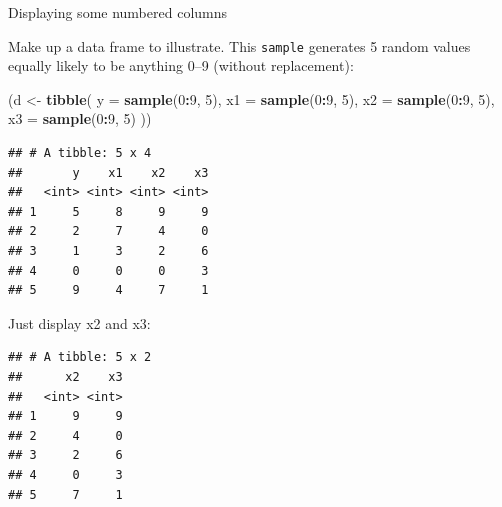 \documentclass[ignorenonframetext,]{beamer}
\newenvironment{Shaded}{\begin{snugshade}}{\end{snugshade}}
\newcommand{\DataTypeTok}[1]{\textcolor[rgb]{0.13,0.29,0.53}{#1}}
\newcommand{\DecValTok}[1]{\textcolor[rgb]{0.00,0.00,0.81}{#1}}
\newcommand{\KeywordTok}[1]{\textcolor[rgb]{0.13,0.29,0.53}{\textbf{#1}}}
\newcommand{\NormalTok}[1]{#1}
\newcommand{\OperatorTok}[1]{\textcolor[rgb]{0.81,0.36,0.00}{\textbf{#1}}}
\newcommand{\StringTok}[1]{\textcolor[rgb]{0.31,0.60,0.02}{#1}}
\begin{document}
\begin{frame}[fragile]{Displaying some numbered columns}
\protect\hypertarget{displaying-some-numbered-columns}{}

Make up a data frame to illustrate. This \texttt{sample} generates 5
random values equally likely to be anything 0--9 (without replacement):

\begin{Shaded}
\begin{Highlighting}[]
\NormalTok{(d <-}\StringTok{ }\KeywordTok{tibble}\NormalTok{(}
  \DataTypeTok{y =} \KeywordTok{sample}\NormalTok{(}\DecValTok{0}\OperatorTok{:}\DecValTok{9}\NormalTok{, }\DecValTok{5}\NormalTok{),}
  \DataTypeTok{x1 =} \KeywordTok{sample}\NormalTok{(}\DecValTok{0}\OperatorTok{:}\DecValTok{9}\NormalTok{, }\DecValTok{5}\NormalTok{),}
  \DataTypeTok{x2 =} \KeywordTok{sample}\NormalTok{(}\DecValTok{0}\OperatorTok{:}\DecValTok{9}\NormalTok{, }\DecValTok{5}\NormalTok{),}
  \DataTypeTok{x3 =} \KeywordTok{sample}\NormalTok{(}\DecValTok{0}\OperatorTok{:}\DecValTok{9}\NormalTok{, }\DecValTok{5}\NormalTok{)}
\NormalTok{))}
\end{Highlighting}
\end{Shaded}

\begin{verbatim}
## # A tibble: 5 x 4
##       y    x1    x2    x3
##   <int> <int> <int> <int>
## 1     5     8     9     9
## 2     2     7     4     0
## 3     1     3     2     6
## 4     0     0     0     3
## 5     9     4     7     1
\end{verbatim}

\end{frame}

\begin{frame}[fragile]{Just display x2 and x3:}
\protect\hypertarget{just-display-x2-and-x3}{}

\begin{Shaded}
\end{Shaded}

\begin{verbatim}
## # A tibble: 5 x 2
##      x2    x3
##   <int> <int>
## 1     9     9
## 2     4     0
## 3     2     6
## 4     0     3
## 5     7     1
\end{verbatim}

\end{frame}
\end{document}
